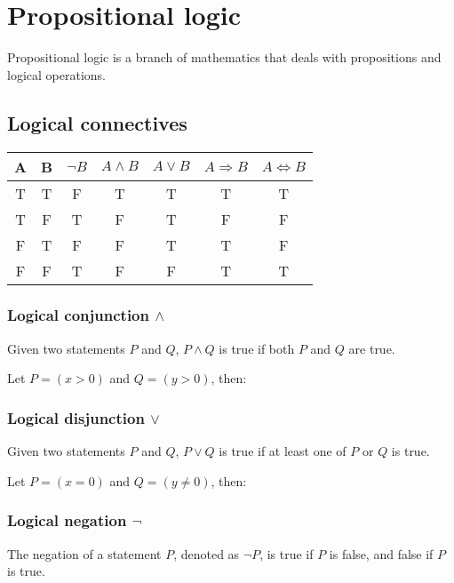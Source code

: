 \documentclass{article}
\newcommand{\figbox}[1]{ 
    \begin{figure*}[ht!]        
        \begin{center}            
            \fbox{#1}        
        \end{center}    
    \end{figure*}
}
\begin{document}
\section{Propositional logic}
Propositional logic is a branch of mathematics that deals with propositions and logical operations.

\subsection{Logical connectives}
\begin{center}
    \begin{tabular}{|c|c|c|c|c|c|c|}
        \hline \rule{0pt}{15pt}
        A & B & $\lnot B$ & $A \land B$ & $A \lor B$ & $A \Rightarrow B$ & $A \Leftrightarrow B$ \\
        \hline \rule{0pt}{15pt} T & T & F & T & T & T & T \\
        \hline \rule{0pt}{15pt} T & F & T & F & T & F & F \\
        \hline \rule{0pt}{15pt} F & T & F & F & T & T & F \\
        \hline \rule{0pt}{15pt} F & F & T & F & F & T & T \\
        \hline
    \end{tabular}
\end{center}

\subsubsection{Logical conjunction $\land$}
Given two statements $P$ and $Q$, $P \land Q$ is true if both $P$ and $Q$ are true.

Let $P=(x>0)$ and $Q=(y>0)$, then:
\figbox{$P \land Q = (x > 0 \land y > 0)$}

\subsubsection{Logical disjunction $\lor$}
Given two statements $P$ and $Q$, $P \lor Q$ is true if at least one of $P$ or $Q$ is true.

Let $P=(x=0)$ and $Q=(y \neq 0)$, then:
\figbox{$P \lor Q = (x = 0 \lor y \neq 0)$}

\subsubsection{Logical negation $\lnot$}
The negation of a statement $P$, denoted as $\lnot P$, is true if $P$ is false, and false if $P$ is true.
\end{document}
